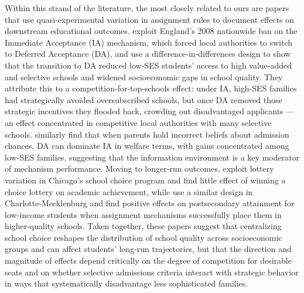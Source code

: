 \documentclass[11pt]{article}
\begin{document}
Within this strand of the literature, the most closely related to ours are papers that use quasi‑experimental variation in assignment rules to document effects on downstream educational outcomes. \citet{terrier2024} exploit England's 2008 nationwide ban on the Immediate Acceptance (IA) mechanism, which forced local authorities to switch to Deferred Acceptance (DA), and use a difference‑in‑differences design to show that the transition to DA reduced low‑SES students' access to high value‑added and selective schools and widened socioeconomic gaps in school quality. They attribute this to a competition‑for‑top‑schools effect: under IA, high‑SES families had strategically avoided oversubscribed schools, but once DA removed those strategic incentives they flooded back, crowding out disadvantaged applicants — an effect concentrated in competitive local authorities with many selective schools. \citet{kaporneilsonzimmerman2020} similarly find that when parents hold incorrect beliefs about admission chances, DA can dominate IA in welfare terms, with gains concentrated among low‑SES families, suggesting that the information environment is a key moderator of mechanism performance. Moving to longer‑run outcomes, \citet{cullenjacobleviit2006} exploit lottery variation in Chicago's school choice program and find little effect of winning a choice lottery on academic achievement, while \citet{demingetal2014} use a similar design in Charlotte‑Mecklenburg and find positive effects on postsecondary attainment for low‑income students when assignment mechanisms successfully place them in higher‑quality schools. Taken together, these papers suggest that centralizing school choice reshapes the distribution of school quality across socioeconomic groups and can affect students' long‑run trajectories, but that the direction and magnitude of effects depend critically on the degree of competition for desirable seats and on whether selective admissions criteria interact with strategic behavior in ways that systematically disadvantage less sophisticated families.







\end{document}
